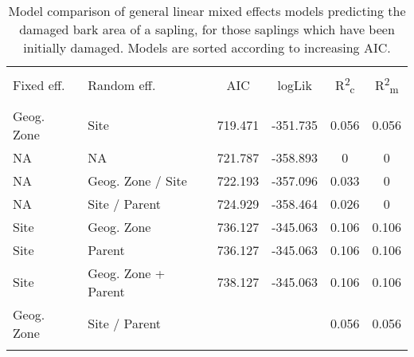 
\begin{table}[!htbp] \centering 
  \caption{Model comparison of general linear mixed effects models predicting the damaged bark area of a sapling, for those saplings which have been initially damaged. Models are sorted according to increasing AIC.} 
  \label{lmer_comp} 
\begin{tabular}{@{\extracolsep{5pt}} llS[table-format=3.2]S[table-format=3.2]S[table-format=3.2]S[table-format=3.2]} 
\\[-1.8ex]\hline 
\hline \\[-1.8ex] 
{Fixed eff.} & {Random eff.} & {AIC} & {logLik} & {R\textsuperscript{2}\textsubscript{c}} & {R\textsuperscript{2}\textsubscript{m}} \\
\hline \\[-1.8ex] 
Geog. Zone & Site & 719.471 & -351.735 & 0.056 & 0.056 \\ 
NA & NA & 721.787 & -358.893 & 0 & 0 \\ 
NA & Geog. Zone / Site & 722.193 & -357.096 & 0.033 & 0 \\ 
NA & Site / Parent & 724.929 & -358.464 & 0.026 & 0 \\ 
Site & Geog. Zone & 736.127 & -345.063 & 0.106 & 0.106 \\ 
Site & Parent & 736.127 & -345.063 & 0.106 & 0.106 \\ 
Site & Geog. Zone + Parent & 738.127 & -345.063 & 0.106 & 0.106 \\ 
Geog. Zone & Site / Parent &  &  & 0.056 & 0.056 \\ 
\hline \\[-1.8ex] 
\end{tabular} 
\end{table} 
